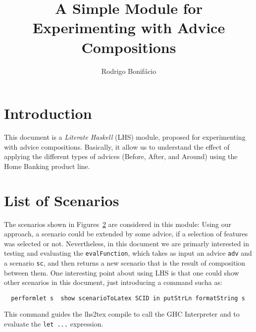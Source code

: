 \documentclass{article}
\title{A Simple Module for Experimenting with Advice Compositions}
\author{Rodrigo Bonif\'{a}cio}
\begin{document}
\maketitle

\section{Introduction}

This document is a \emph{Literate Haskell} (LHS) module, proposed for 
experimenting with advice compositions. Basically, it allow us to 
understand the effect of applying the different types of advices 
(Before, After, and Around) using the Home Banking product line. 



\section{List of Scenarios}

The scenarios shown in Figures~\ref{} are considered in this module:
Using our approach, a scenario could be extended by some advice, if a selection of features was selected or not. 
Nevertheless, in this document we are primarly interested in testing and evaluating the 
\texttt{evalFunction}, which takes as input an advice \texttt{adv} and a 
scenario \texttt{sc}, and then returns a new scenario that is the result of composition 
between them. One interesting point about using LHS is that one could show other scenarios in 
this document, just introducing a command sucha as: 

\begin{tabbing}\tt
~performlet~s~~show~scenarioToLatex~SCID~in~putStrLn~formatString~s
\end{tabbing}

This command guides the lhs2tex compile to call the GHC Interpreter and 
to evaluate the \texttt{let ...} expression. 
\end{document}
